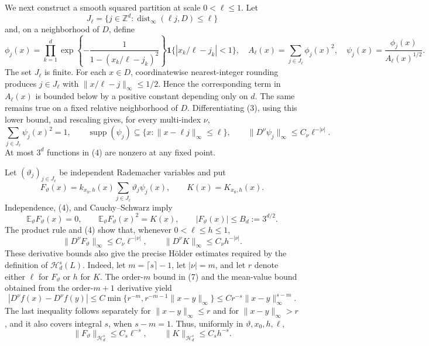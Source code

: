 We next construct a smooth squared partition at scale \(0<\ell\le1\).  Let
\[
 J_\ell=\{j\in\mathbb Z^d:\operatorname{dist}_\infty(\ell j,D)\le\ell\}
\]
and, on a neighborhood of \(D\), define
\[
 \phi_j(x)=\prod_{k=1}^d
 \exp\!\left\{-\frac{1}{1-(x_k/\ell-j_k)^2}\right\}
 \mathbf 1\{|x_k/\ell-j_k|<1\},
 \quad
 A_\ell(x)=\sum_{j\in J_\ell}\phi_j(x)^2,
 \quad
 \psi_j(x)=\frac{\phi_j(x)}{A_\ell(x)^{1/2}}.                    \tag{3}
\]
The set \(J_\ell\) is finite.  For each \(x\in D\), coordinatewise nearest-integer rounding produces \(j\in J_\ell\) with \(\lVert x/\ell-j\rVert_\infty\le1/2\).  Hence the corresponding term in \(A_\ell(x)\) is bounded below by a positive constant depending only on \(d\).  The same remains true on a fixed relative neighborhood of \(D\).  Differentiating (3), using this lower bound, and rescaling gives, for every multi-index \(\nu\),
\[
 \sum_{j\in J_\ell}\psi_j(x)^2=1,
 \qquad
 \operatorname{supp}(\psi_j)\subseteq
 \{x:\lVert x-\ell j\rVert_\infty\le\ell\},
 \qquad
 \lVert D^\nu\psi_j\rVert_\infty\le C_\nu\ell^{-|\nu|}.       \tag{4}
\]
At most \(3^d\) functions in (4) are nonzero at any fixed point.

Let \((\vartheta_j)_{j\in J_\ell}\) be independent Rademacher variables and put
\[
 F_\vartheta(x)=k_{x_0,h}(x)\sum_{j\in J_\ell}\vartheta_j\psi_j(x),
 \qquad K(x)=K_{x_0,h}(x).                                      \tag{5}
\]
Independence, (4), and Cauchy--Schwarz imply
\[
 \mathbb E_\vartheta F_\vartheta(x)=0,
 \qquad
 \mathbb E_\vartheta F_\vartheta(x)^2=K(x),
 \qquad
 |F_\vartheta(x)|\le B_d:=3^{d/2}.                              \tag{6}
\]
The product rule and (4) show that, whenever \(0<\ell\le h\le1\),
\[
 \lVert D^\nu F_\vartheta\rVert_\infty\le C_\nu\ell^{-|\nu|},
 \qquad
 \lVert D^\nu K\rVert_\infty\le C_\nu h^{-|\nu|}.            \tag{7}
\]
These derivative bounds also give the precise H\"older estimates required by the definition of \(\mathcal H_d^s(L)\).  Indeed, let \(m=\lceil s\rceil-1\), let \(|\nu|=m\), and let \(r\) denote either \(\ell\) for \(F_\vartheta\) or \(h\) for \(K\).  The order-\(m\) bound in (7) and the mean-value bound obtained from the order-\(m+1\) derivative yield
\[
 |D^\nu f(x)-D^\nu f(y)|
 \le C\min\{r^{-m},r^{-m-1}\lVert x-y\rVert_\infty\}
 \le Cr^{-s}\lVert x-y\rVert_\infty^{s-m}.                    \tag{8}
\]
The last inequality follows separately for \(\lVert x-y\rVert_\infty\le r\) and for \(\lVert x-y\rVert_\infty>r\), and it also covers integral \(s\), when \(s-m=1\).  Thus, uniformly in \(\vartheta,x_0,h,\ell\),
\[
 \lVert F_\vartheta\rVert_{\mathcal H_d^s}\le C_s\ell^{-s},
 \qquad
 \lVert K\rVert_{\mathcal H_d^s}\le C_sh^{-s}.                \tag{9}
\]

